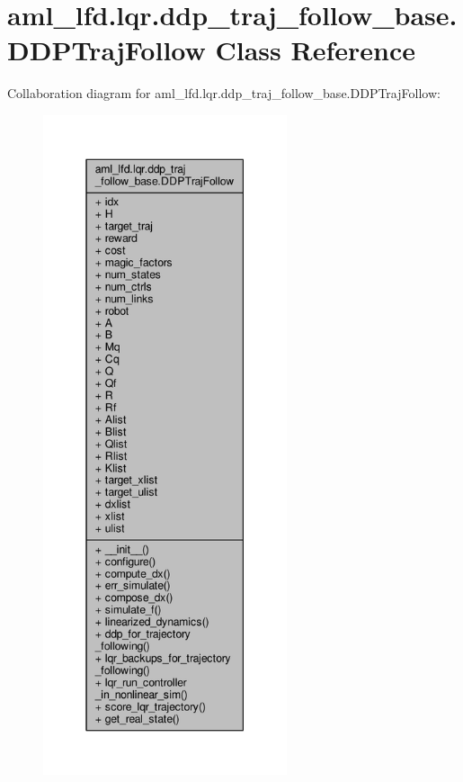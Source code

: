 \hypertarget{classaml__lfd_1_1lqr_1_1ddp__traj__follow__base_1_1_d_d_p_traj_follow}{\section{aml\-\_\-lfd.\-lqr.\-ddp\-\_\-traj\-\_\-follow\-\_\-base.\-D\-D\-P\-Traj\-Follow Class Reference}
\label{classaml__lfd_1_1lqr_1_1ddp__traj__follow__base_1_1_d_d_p_traj_follow}
}


Collaboration diagram for aml\-\_\-lfd.\-lqr.\-ddp\-\_\-traj\-\_\-follow\-\_\-base.\-D\-D\-P\-Traj\-Follow\-:
\nopagebreak
\begin{figure}[H]
\begin{center}
\leavevmode
\includegraphics[height=550pt]{classaml__lfd_1_1lqr_1_1ddp__traj__follow__base_1_1_d_d_p_traj_follow__coll__graph}
\end{center}
\end{figure}
